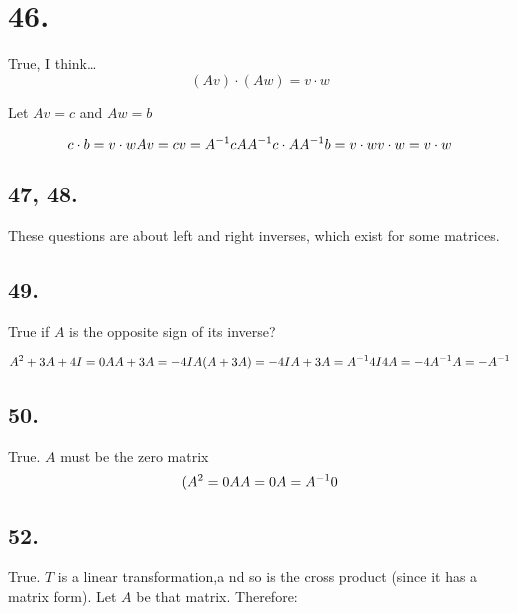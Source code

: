\documentclass[]{article}
\begin{document}
\hypertarget{section-155}{%
\section{46.}\label{section-155}}

True, I think\ldots{} \[(Av)\cdot(Aw)=v\cdot{w}\]

Let \(Av=c\) and \(Aw=b\)

\[c\cdot{b}=v\cdot{w}\\
Av=c\\
v=A^{-1}c\\
AA^{-1}c\cdot{AA^{-1}b}=v\cdot{w}\\
v\cdot{w}=v\cdot{w}\]

\hypertarget{section-156}{%
\subsection{47, 48.}\label{section-156}}

These questions are about left and right inverses, which exist for some
matrices.

\hypertarget{section-157}{%
\subsection{49.}\label{section-157}}

True if \(A\) is the opposite sign of its inverse?

\[A^2+3A+4I=0\\
AA+3A=-4I\\
A(A+3A)=-4I\\
A+3A=A^{-1}4I\\
4A=-4A^{-1}\\
A=-A^{-1}\]

\hypertarget{section-158}{%
\subsection{50.}\label{section-158}}

True. \(A\) must be the zero matrix \[(A^2=0\\
AA=0\\
A=A^{-1}0\]

\hypertarget{section-159}{%
\subsection{52.}\label{section-159}}

True. \(T\) is a linear transformation,a nd so is the cross product
(since it has a matrix form). Let \(A\) be that matrix. Therefore:
\end{document}
